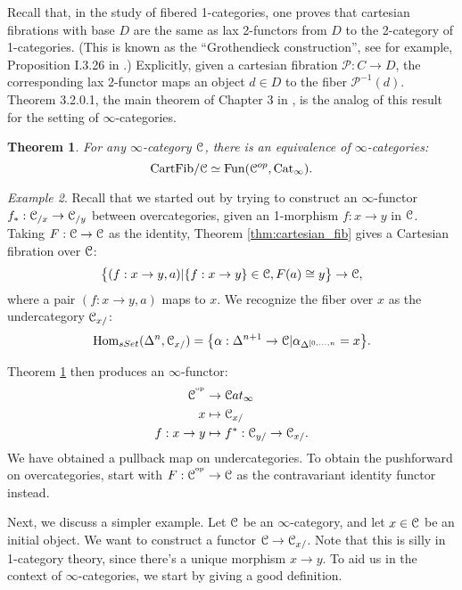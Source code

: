 \documentclass[10pt,a4paper,reqno,oneside]{book} %
\theoremstyle{plain}
\newtheorem{thm}{Theorem}[section]
\theoremstyle{definition}
\theoremstyle{remark}
\newtheorem{eg}[thm]{Example}
\numberwithin{equation}{section}
\begin{document}
Recall that, in the study of fibered 1-categories, one proves that cartesian fibrations with base $D$ are the same as
lax 2-functors from $D$ to the 2-category of 1-categories. (This is known as the ``Grothendieck construction'', see
for example, Proposition I.3.26 in \cite{FGAex}.) Explicitly, given a cartesian fibration $\mathcal{P} : C \to D$,
the corresponding lax 2-functor maps an object $d \in D$ to the fiber $\mathcal{P}^{-1}(d)$.
Theorem 3.2.0.1, the main theorem of Chapter 3 in \cite{HTT}, is the analog of this result for the setting of $\infty$-categories.

\begin{thm}
\label{thm:cartesian_equiv}
For any $\infty$-category $\mathcal C$, there is an equivalence of $\infty$-categories:
\begin{equation}		
\text{CartFib}/\mathcal C \simeq \operatorname{Fun}(\mathcal C^{op},\mathrm{Cat}_{\infty}).
\end{equation}
\end{thm}

\begin{eg}
\label{eg:composition}
Recall that we started out by trying to construct an $\infty$-functor $f_* : \mathcal C_{/x} \to \mathcal C_{/y}$ between overcategories,
given an 1-morphism $f: x \to y$ in $\mathcal C$. Taking $F : \mathcal C \to \mathcal C$ as the identity, Theorem \ref{thm:cartesian_fib} gives
a Cartesian fibration over $\mathcal C$:
\[	  \big\{ (f : x \to y, a) | \{f :x \to y\} \in \mathcal C, F(a) \cong y \big\} \to \mathcal C,	\]
where a pair $(f : x \to y, a)$ maps to $x$. We recognize the fiber over $x$ as the undercategory $\mathcal C_{x/}$:
\[	\operatorname{Hom}_{sSet}(\Delta^n, \mathcal C_{x/}) = \big\{\alpha: \Delta^{n+1} \to \mathcal C | \alpha_{\Delta^{[0,\dots,n}} = x \big\}.	\]

Theorem \ref{thm:cartesian_equiv} then produces an $\infty$-functor:
\begin{align*}
\mathcal C^{^\mathrm{op}} &\to \mathcal C at_{\infty} \\
x & \mapsto \mathcal C_{x/} \\
f:x\to y & \mapsto f^* : \mathcal C_{y/} \to \mathcal C_{x/}.
\end{align*}
We have obtained a pullback map on undercategories. To obtain the pushforward on overcategories, start with $F : \mathcal C^{^\mathrm{op}} \to \mathcal C$
as the contravariant identity functor instead.
\end{eg}

Next, we discuss a simpler example. Let $\mathcal C$ be an $\infty$-category, and let $x \in \mathcal C$ be an initial object. 
We want to construct a functor $\mathcal C \to \mathcal C_{x/}$. Note that this is silly in 1-category theory, since there's a unique 
morphism $x \to y$. To aid us in the context of $\infty$-categories, we start
by giving a good definition. 
\end{document}
